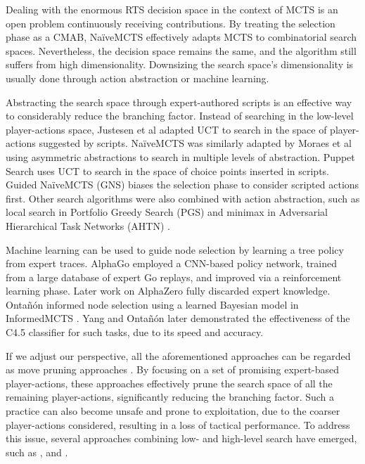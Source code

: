 \documentclass[conference]{IEEEtran}
\begin{document}
Dealing with the enormous RTS decision space in the context of MCTS is an open problem continuously receiving contributions. By treating the selection phase as a CMAB, NaïveMCTS effectively adapts MCTS to combinatorial search spaces. Nevertheless, the decision space remains the same, and the algorithm still suffers from high dimensionality. Downsizing the search space's dimensionality is usually done through action abstraction or machine learning.

Abstracting the search space through expert-authored scripts is an effective way to considerably reduce the branching factor. Instead of searching in the low-level player-actions space, Justesen et al \cite{justesen_script-_2014} adapted UCT to search in the space of player-actions suggested by scripts. NaïveMCTS was similarly adapted by Moraes et al \cite{moraes_action_2018} using asymmetric abstractions \cite{moraes_asymmetric_2018} to search in multiple levels of abstraction. Puppet Search \cite{barriga_puppet_2015} uses UCT to search in the space of choice points inserted in scripts. Guided NaïveMCTS (GNS) \cite{yang_guiding_2019} biases the selection phase to consider scripted actions first. Other search algorithms were also combined with action abstraction, such as local search in Portfolio Greedy Search (PGS) \cite{churchill_portfolio_2013} and minimax in Adversarial Hierarchical Task Networks (AHTN) \cite{ontanon_adversarial_2015}.

Machine learning can be used to guide node selection by learning a tree policy from expert traces. AlphaGo \cite{silver_mastering_2016} employed a CNN-based policy network, trained from a large database of expert Go replays, and improved via a reinforcement learning phase. Later work on AlphaZero \cite{silver_general_2018} fully discarded expert knowledge. Ontañón informed node selection using a learned Bayesian model in InformedMCTS \cite{ontanon_informed_2016}. Yang and Ontañón \cite{yang_extracting_2019} later demonstrated the effectiveness of the C4.5 classifier for such tasks, due to its speed and accuracy.


If we adjust our perspective, all the aforementioned approaches can be regarded as move pruning approaches \cite{yang_integrating_2020}. By focusing on a set of promising expert-based player-actions, these approaches effectively prune the search space of all the remaining player-actions, significantly reducing the branching factor. Such a practice can also become unsafe and prone to exploitation, due to the coarser player-actions considered, resulting in a loss of tactical performance. To address this issue, several approaches combining low- and high-level search have emerged, such as \cite{barriga_combining_2017}, \cite{neufeld_hybrid_2019} and \cite{moraes_action_2018}.
\end{document}
